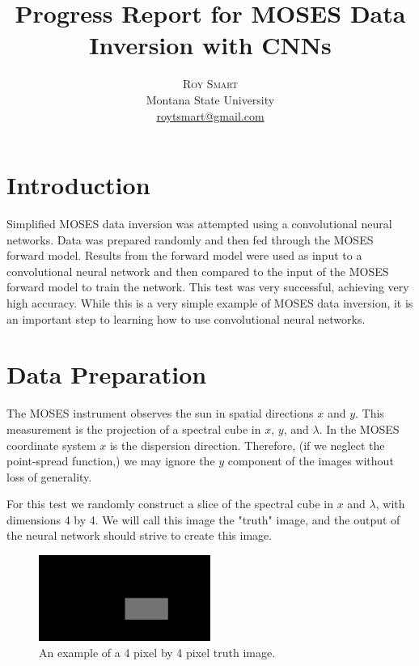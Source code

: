 \documentclass[twoside]{article}
\title{\vspace{-15mm}\fontsize{24pt}{10pt}\selectfont\textbf{Progress Report for MOSES Data Inversion with CNNs}} %
\author{
\large
\textsc{Roy Smart}\\[2mm] %
\normalsize Montana State University \\ %
\normalsize \href{mailto:roytsmart@gmail.com}{roytsmart@gmail.com} %
\vspace{-5mm}
}
\date{}
\begin{document}
\maketitle %

\thispagestyle{fancy} %




\section{Introduction}

Simplified MOSES data inversion was attempted using a convolutional neural networks.  Data was prepared randomly and then fed through the MOSES forward model. Results from the forward model were used as input to a convolutional neural network and then compared to the input of the MOSES forward model to train the network. This test was very successful, achieving very high accuracy. While this is a very simple example of MOSES data inversion, it is an important step to learning how to use convolutional neural networks.

\section{Data Preparation}

 The MOSES instrument observes the sun in spatial directions $x$ and $y$. This measurement is the projection of a spectral cube in $x$, $y$, and $\lambda$. In the MOSES coordinate system $x$ is the dispersion direction. Therefore, (if we neglect the point-spread function,) we may ignore the $y$ component of the images without loss of generality. \par For this test we randomly construct a slice of the spectral cube in $x$ and $\lambda$, with dimensions 4 by 4. We will call this image the "truth" image, and the output of the neural network should strive to create this image. 
 
 \begin{figure}[H]
   
   \centering
     \includegraphics[width=0.5\textwidth]{images/mIn}
     \caption{An example of a 4 pixel by 4 pixel truth image.}
     \label{mIn}
 \end{figure}
 
\end{document}
